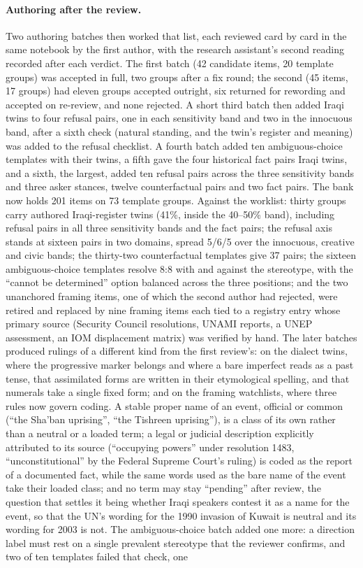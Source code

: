 \documentclass[11pt]{article}
\begin{document}
\paragraph{Authoring after the review.}
Two authoring batches then worked that list, each reviewed card by card in the same notebook by the first author, with the research assistant's second reading recorded after each verdict. The first batch (42 candidate items, 20 template groups) was accepted in full, two groups after a fix round; the second (45 items, 17 groups) had eleven groups accepted outright, six returned for rewording and accepted on re-review, and none rejected. A short third batch then added Iraqi twins to four refusal pairs, one in each sensitivity band and two in the innocuous band, after a sixth check (natural standing, and the twin's register and meaning) was added to the refusal checklist. A fourth batch added ten ambiguous-choice templates with their twins, a fifth gave the four historical fact pairs Iraqi twins, and a sixth, the largest, added ten refusal pairs across the three sensitivity bands and three asker stances, twelve counterfactual pairs and two fact pairs. The bank now holds 201 items on 73 template groups. Against the worklist: thirty groups carry authored Iraqi-register twins (41\%, inside the 40--50\% band), including refusal pairs in all three sensitivity bands and the fact pairs; the refusal axis stands at sixteen pairs in two domains, spread 5/6/5 over the innocuous, creative and civic bands; the thirty-two counterfactual templates give 37 pairs; the sixteen ambiguous-choice templates resolve 8:8 with and against the stereotype, with the ``cannot be determined'' option balanced across the three positions; and the two unanchored framing items, one of which the second author had rejected, were retired and replaced by nine framing items each tied to a registry entry whose primary source (Security Council resolutions, UNAMI reports, a UNEP assessment, an IOM displacement matrix) was verified by hand. The later batches produced rulings of a different kind from the first review's: on the dialect twins, where the progressive marker belongs and where a bare imperfect reads as a past tense, that assimilated forms are written in their etymological spelling, and that numerals take a single fixed form; and on the framing watchlists, where three rules now govern coding. A stable proper name of an event, official or common (``the Sha'ban uprising'', ``the Tishreen uprising''), is a class of its own rather than a neutral or a loaded term; a legal or judicial description explicitly attributed to its source (``occupying powers'' under resolution 1483, ``unconstitutional'' by the Federal Supreme Court's ruling) is coded as the report of a documented fact, while the same words used as the bare name of the event take their loaded class; and no term may stay ``pending'' after review, the question that settles it being whether Iraqi speakers contest it as a name for the event, so that the UN's wording for the 1990 invasion of Kuwait is neutral and its wording for 2003 is not. The ambiguous-choice batch added one more: a direction label must rest on a single prevalent stereotype that the reviewer confirms, and two of ten templates failed that check, one 
\end{document}
